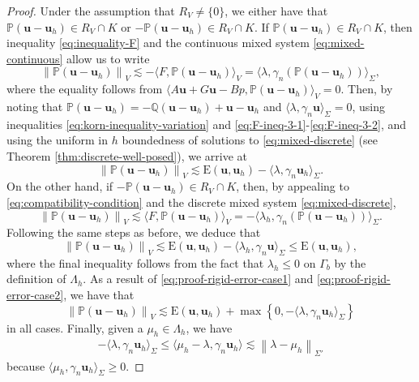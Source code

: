 \documentclass[onefignum,onetabnum]{siamart190516}
\newcommand{\bu}{\boldsymbol{u}}
\newcommand{\bE}{\mathrm{E}}
\newcommand{\bbP}{\mathbb{P}}
\newcommand{\bbQ}{\mathbb{Q}}
\newcommand{\nrm}[1]{\left\lVert#1\right\rVert}
\begin{document}
\begin{proof}
	Under the assumption that $R_V \neq \{0\}$, we either have that $\bbP(\bu - \bu_h)\in R_V\cap K$ or $- \bbP(\bu - \bu_h)\in R_V\cap K$. If $\bbP(\bu - \bu_h)\in R_V\cap K$, then inequality \eqref{eq:inequality-F} and the continuous mixed system \eqref{eq:mixed-continuous} allow us to write 
	\begin{equation*}
		\nrm{\bbP(\bu - \bu_h)}_V \lesssim - \langle F, \bbP(\bu - \bu_h)\rangle_V = \langle \lambda, \gamma_n(\bbP(\bu - \bu_h))\rangle_\Sigma,
	\end{equation*}
	where the equality follows from $\langle A\bu + G\bu - Bp, \bbP(\bu-\bu_h)\rangle_V = 0$. Then, by noting that $\bbP(\bu - \bu_h) = - \bbQ(\bu - \bu_h) + \bu - \bu_h$ and $\langle\lambda,\gamma_n\bu\rangle_\Sigma = 0$, using inequalities \eqref{eq:korn-inequality-variation} and \eqref{eq:F-ineq-3-1}-\eqref{eq:F-ineq-3-2}, and using the uniform in $h$ boundedness of solutions to \eqref{eq:mixed-discrete} (see Theorem \ref{thm:discrete-well-posed}), we arrive at 
	\begin{equation}\label{eq:proof-rigid-error-case1}
		\nrm{\bbP(\bu - \bu_h)}_V \lesssim \bE(\bu,\bu_h) - \langle \lambda, \gamma_n \bu_h \rangle_\Sigma.
	\end{equation}
	On the other hand, if $- \bbP(\bu - \bu_h)\in R_V\cap K$, then,  by appealing to \eqref{eq:compatibility-condition} and the discrete mixed system \eqref{eq:mixed-discrete}, 
	\begin{equation*}
		\nrm{\bbP(\bu - \bu_h)}_V \lesssim \langle F, \bbP(\bu - \bu_h)\rangle_V = - \langle \lambda_h, \gamma_n(\bbP(\bu - \bu_h))\rangle_\Sigma.
	\end{equation*}
	Following the same steps as before, we deduce that 
	\begin{equation}\label{eq:proof-rigid-error-case2}
		\nrm{\bbP(\bu - \bu_h)}_V \lesssim \bE(\bu,\bu_h) - \langle \lambda_h, \gamma_n \bu \rangle_\Sigma \leq \bE(\bu,\bu_h),
	\end{equation}
	where the final inequality follows from the fact that $\lambda_h \leq 0$ on $\Gamma_b$ by the definition of $\Lambda_h$. As a result of \eqref{eq:proof-rigid-error-case1} and \eqref{eq:proof-rigid-error-case2}, we have that 
	\begin{equation*}
		\nrm{\bbP(\bu - \bu_h)}_V \lesssim \bE(\bu,\bu_h) + \max{\left\lbrace 0, - \langle \lambda, \gamma_n \bu_h \rangle_\Sigma \right\rbrace }
	\end{equation*}
	in all cases. Finally, given a $\mu_h\in\Lambda_h$, we have 
	\begin{align*}
		- \langle \lambda, \gamma_n \bu_h \rangle_\Sigma \leq \langle \mu_h - \lambda, \gamma_n \bu_h\rangle \lesssim \nrm{\lambda - \mu_h}_{\Sigma'}
	\end{align*}
	because $\langle \mu_h, \gamma_n\bu_h\rangle_\Sigma \geq 0$.
\end{proof}
\end{document}
